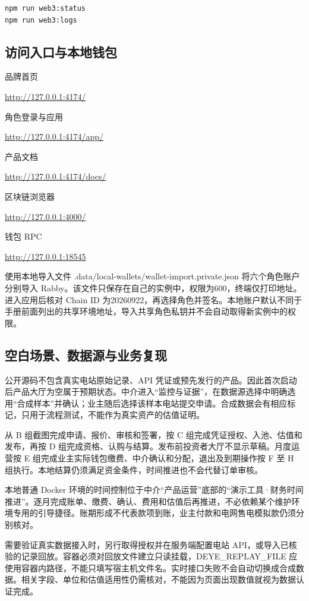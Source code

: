 \documentclass[12pt,a4paper]{article}
\begin{document}
\begin{verbatim}
npm run web3:status
npm run web3:logs
\end{verbatim}
\subsection{访问入口与本地钱包}
品牌首页\par\url{http://127.0.0.1:4174/}\par
角色登录与应用\par\url{http://127.0.0.1:4174/app/}\par
产品文档\par\url{http://127.0.0.1:4174/docs/}\par
区块链浏览器\par\url{http://127.0.0.1:4000/}\par
钱包 RPC\par\url{http://127.0.0.1:18545}\par
使用本地导入文件 .data/local-wallets/wallet-import.private.json 将六个角色账户分别导入 Rabby。该文件只保存在自己的实例中，权限为600，终端仅打印地址。进入应用后核对 Chain ID 为20260922，再选择角色并签名。本地账户默认不同于手册前面列出的共享环境地址，导入共享角色私钥并不会自动取得新实例中的权限。

\subsection{空白场景、数据源与业务复现}
公开源码不包含真实电站原始记录、API 凭证或预先发行的产品。因此首次启动后产品大厅为空属于预期状态。中介进入“监控与证据”，在数据源选择中明确选用“合成样本”并确认；业主随后选择该样本电站提交申请。合成数据会有相应标记，只用于流程测试，不能作为真实资产的估值证明。

从 B 组截图完成申请、报价、审核和签署，按 C 组完成凭证授权、入池、估值和发布，再按 D 组完成资格、认购与结算。发布前投资者大厅不显示草稿。月度运营按 E 组完成业主实际钱包缴费、中介确认和分配，退出及到期操作按 F 至 H 组执行。本地结算仍须满足资金条件，时间推进也不会代替订单审核。

本地普通 Docker 环境的时间控制位于中介“产品运营”底部的“演示工具·财务时间推进”。逐月完成账单、缴费、确认、费用和估值后再推进，不必依赖某个维护环境专用的引导捷径。账期形成不代表款项到账，业主付款和电网售电模拟款仍须分别核对。

需要验证真实数据接入时，另行取得授权并在服务端配置电站 API，或导入已核验的记录回放。容器必须对回放文件建立只读挂载，DEYE\_REPLAY\_FILE 应使用容器内路径，不能只填写宿主机文件名。实时接口失败不会自动切换成合成数据。相关字段、单位和估值适用性仍需核对，不能因为页面出现数值就视为数据认证完成。
\end{document}
